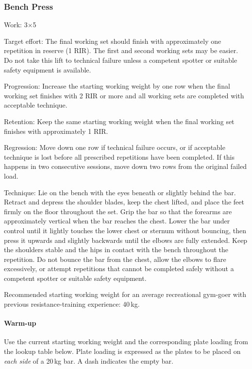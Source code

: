 \documentclass[11pt,a4paper]{article}
\begin{document}
\newpage
\subsubsection{Bench Press}

Work: 3$\times$5

Target effort: The final working set should finish with approximately one repetition in reserve (1 RIR). The first and second working sets may be easier. Do not take this lift to technical failure unless a competent spotter or suitable safety equipment is available.

Progression: Increase the starting working weight by one row when the final working set finishes with 2 RIR or more and all working sets are completed with acceptable technique.

Retention: Keep the same starting working weight when the final working set finishes with approximately 1 RIR.

Regression: Move down one row if technical failure occurs, or if acceptable technique is lost before all prescribed repetitions have been completed. If this happens in two consecutive sessions, move down two rows from the original failed load.

Technique: Lie on the bench with the eyes beneath or slightly behind the bar. Retract and depress the shoulder blades, keep the chest lifted, and place the feet firmly on the floor throughout the set. Grip the bar so that the forearms are approximately vertical when the bar reaches the chest. Lower the bar under control until it lightly touches the lower chest or sternum without bouncing, then press it upwards and slightly backwards until the elbows are fully extended. Keep the shoulders stable and the hips in contact with the bench throughout the repetition. Do not bounce the bar from the chest, allow the elbows to flare excessively, or attempt repetitions that cannot be completed safely without a competent spotter or suitable safety equipment.

Recommended starting working weight for an average recreational gym-goer with previous resistance-training experience: 40\,kg.

\paragraph{Warm-up}

Use the current starting working weight and the corresponding plate loading from the lookup table below. Plate loading is expressed as the plates to be placed on \emph{each side} of a 20\,kg bar. A dash indicates the empty bar.
\end{document}
